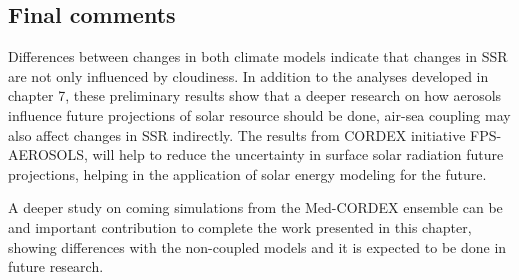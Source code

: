 \subsection*{Final comments}

Differences between changes in both climate models indicate that changes in SSR are not only influenced by cloudiness. In addition to the analyses developed in chapter 7, these preliminary results show that a deeper research on how aerosols influence future projections of solar resource should be done, air-sea coupling may also affect changes in SSR indirectly. The results from CORDEX initiative FPS-AEROSOLS, will help to reduce the uncertainty in surface solar radiation future projections, helping in the application of solar energy modeling for the future. 

A deeper study on coming simulations from the Med-CORDEX ensemble can be and important contribution to complete the work presented in this chapter, showing differences with the non-coupled models and it is expected to be done in future research.

% 